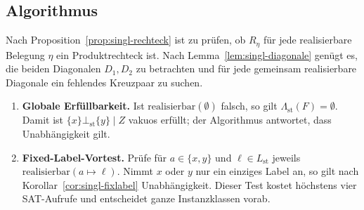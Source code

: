 \subsection{Algorithmus}
\label{subsec:singl-algo}

Nach Proposition~\ref{prop:singl-rechteck} ist zu prüfen, ob \(R_\eta\) für
jede realisierbare Belegung \(\eta\) ein Produktrechteck ist. Nach
Lemma~\ref{lem:singl-diagonale} genügt es, die beiden Diagonalen
\(D_1,D_2\) zu betrachten und für jede gemeinsam realisierbare Diagonale ein
fehlendes Kreuzpaar zu suchen.

\begin{enumerate}
    \item \textbf{Globale Erfüllbarkeit.} Ist
    \(\mathrm{realisierbar}(\emptyset)\) falsch, so gilt
    \(\Lambda_{\mathrm{st}}(F)=\emptyset\). Damit ist
    \(\{x\}\bot_{\mathrm{st}}\{y\}\mid Z\) vakuos erfüllt; der Algorithmus
    antwortet, dass Unabhängigkeit gilt.

    \item \textbf{Fixed-Label-Vortest.} Prüfe für \(a\in\{x,y\}\) und
    \(\ell\in L_{\mathrm{st}}\) jeweils \(\mathrm{realisierbar}(a\mapsto\ell)\).
    Nimmt \(x\) oder \(y\) nur ein einziges Label an, so gilt nach
    Korollar~\ref{cor:singl-fixlabel} Unabhängigkeit. Dieser Test kostet
    höchstens vier SAT-Aufrufe und entscheidet ganze Instanzklassen vorab.


\end{enumerate}
